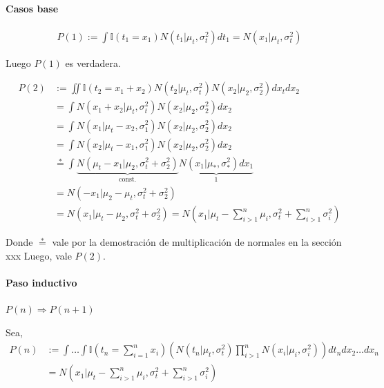\documentclass[11pt,twoside,spanish]{report} %
\begin{document}
\paragraph{Casos base}

\begin{equation}
	\begin{split}
		P(1) := \int \mathbb{I}(t_1 = x_1) N(t_1|\mu_t,\sigma_t^2) dt_1 = N(x_1|\mu_t,\sigma_t^2)
	\end{split}
\end{equation}

Luego $P(1)$ es verdadera.

\begin{equation}
	\begin{split}
		P(2) & := \iint \mathbb{I}(t_2 = x_1 + x_2) N(t_2|\mu_t, \sigma_t^2)N(x_2|\mu_2, \sigma_2^2) dx_tdx_2 \\
		&= \int N( x_1 + x_2|\mu_t, \sigma_t^2) N(x_2|\mu_2, \sigma_2^2) dx_2   \\
		& = \int N(x_1|\mu_t-x_2, \sigma_1^2) N(x_2| \mu_2, \sigma_2^2) dx_2 \\
		& = \int N(x_2|\mu_t-x_1, \sigma_1^2) N(x_2| \mu_2, \sigma_2^2) dx_2 \\
		& \overset{*}{=} \int \underbrace{N(\mu_t-x_1|\mu_2,\sigma_t^2 + \sigma_2^2)}_{\text{const.}} \underbrace{N(x_1|\mu_{*},\sigma_{*}^2) dx_1}_{1} \\
		& = N(-x_1|\mu_2-\mu_t,\sigma_t^2 + \sigma_2^2)\\
		& = N(x_1|\mu_t-\mu_2,\sigma_t^2 + \sigma_2^2) = N(x_1|\mu_t-\sum_{i>1}^n \mu_i,\sigma_t^2+\sum_{i>1}^n \sigma_i^2 )
	\end{split}
\end{equation}

Donde $\overset{*}{=}$ vale por la demostraci\'on de multiplicaci\'on de normales en la secci\'on xxx%
Luego, vale $P(2)$.


\paragraph{Paso inductivo} $P(n) \Rightarrow P(n+1)$

Sea,
\begin{equation}
	\begin{split}
		P(n) &:=\int \dots \int \mathbb{I}(t_n= \sum_{i=1}^n x_i ) \left( N(t_n|\mu_t,\sigma_t^2)\prod_{i>1}^n N(x_i|\mu_i,\sigma_i^2) \right)  dt_ndx_2 \dots dx_n\\ &=N\left(x_1|\mu_t-\sum_{i>1}^n \mu_i,\sigma_t^2+\sum_{i>1}^n\sigma_i^2\right)
	\end{split}
\end{equation}
\end{document}
